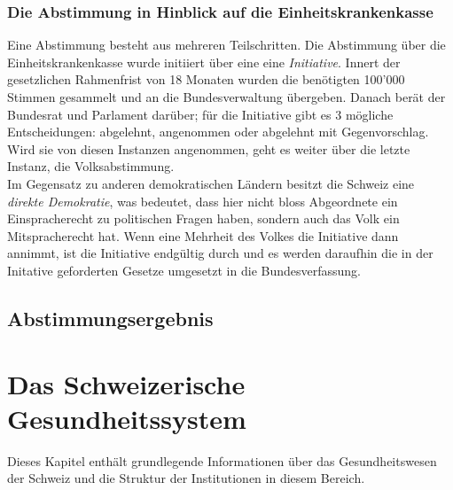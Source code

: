\documentclass[a4paper,12pt]{book}
\begin{document}
\subsection{Die Abstimmung in Hinblick auf die Einheitskrankenkasse}
Eine  Abstimmung besteht aus mehreren Teilschritten.
Die Abstimmung über die Einheitskrankenkasse wurde initiiert über eine eine \emph{Initiative}. Innert der gesetzlichen Rahmenfrist von 18 Monaten wurden die benötigten 100'000 Stimmen gesammelt und an die Bundesverwaltung übergeben.
Danach berät der Bundesrat und Parlament darüber; für die Initiative gibt es 3 mögliche Entscheidungen: abgelehnt, angenommen oder abgelehnt mit Gegenvorschlag. Wird sie von diesen Instanzen angenommen, geht es weiter über die letzte Instanz, die Volksabstimmung.\\

Im Gegensatz zu anderen demokratischen Ländern besitzt die Schweiz eine \emph{direkte Demokratie}, was bedeutet, dass hier nicht bloss Abgeordnete ein Einspracherecht zu politischen Fragen haben, sondern auch das Volk ein Mitspracherecht hat. Wenn eine Mehrheit des Volkes die Initiative dann annimmt, ist die Initiative endgültig durch und es werden daraufhin die in der Initative geforderten Gesetze umgesetzt in die Bundesverfassung.\newline
\section{Abstimmungsergebnis}

\chapter{Das Schweizerische Gesundheitssystem}
Dieses Kapitel enthält grundlegende Informationen über das Gesundheitswesen der Schweiz und die Struktur der Institutionen in diesem Bereich.\\\newline
\end{document}
